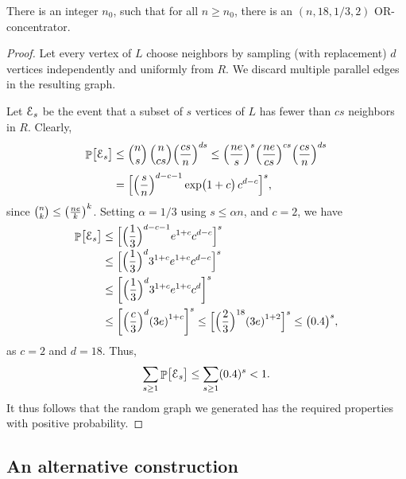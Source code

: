\begin{theorem}
    There is an integer $n_0$, such that for all $n \geq n_0$, there
    is an $(n,18, 1/3, 2)$ OR-concentrator.
\end{theorem}
\begin{proof}
    Let every vertex of $L$ choose neighbors by sampling (with
    replacement) $d$ vertices independently and uniformly from $R$.
    We discard multiple parallel edges in the resulting graph.
    
    Let $\EuScript{E}_s$ be the event that a subset of $s$ vertices of $L$
    has fewer than $cs$ neighbors in $R$. Clearly,
    \begin{align*}
        \Prob{\bigl.\Event_s}%
        &\leq%
        \mybinom{n}{s} \, \mybinom{n}{cs} \pth{ \frac{cs}{n}}^{ds}%
        \leq%
        \pth{\frac{ne}{s}}^s \pth{\frac{ne}{cs}}^{cs} \pth{
           \frac{cs}{n}}^{ds}%
        \\&=%
        \Bigl[ \pth{\frac{s}{n}}^{d-c-1} \exp\pth{\bigl. 1+c}\,
        c^{d-c} \Bigr]^s,
    \end{align*}
    since $\binom{n}{k} \leq \pth{\frac{ne}{k}}^k$. Setting
    $\alpha = 1/3$ using $s\leq \alpha n$, and $c=2$, we have
    \begin{align*}
      \Prob{\bigl. \Event_s}%
      &\leq%
        \brk{ \Bigl. \smash{ \pth{\Bigl.\smash{\frac{1}{3}}}^{d-c-1} e^{1+c} c^{d-c} }}^s%
        \\&\leq %
        \brk{ \Bigl. \smash{\Bigl(\frac{1}{3} \Bigr)^{d}}3^{1+c} e^{1+c} c^{d-c}}^s%
        \\&\leq %
        \brk{ \Bigl( \frac{1}{3} \Bigr)^{d}3^{1+c}
        e^{1+c} c^{d}}^s  \\
      &\leq%
        \brk{ \pth{\frac{c}{3}}^{d}\pth{3e}^{1+c} }^s%
        \leq%
        \Bigl[ \Bigl(\frac{2}{3} \Bigr)^{18}\pth{3e}^{1+2} \Bigr]^s%
        \leq%
        \pth{\bigl.0.4}^s,
    \end{align*}
    as $c=2$ and $d=18$. Thus,
    \begin{align*}
      \sum_{s \geq 1} \Prob{ \bigl. \Event_s}%
      \leq%
      \sum_{s\geq 1} (0.4)^s%
      <%
      1.
    \end{align*}
    It thus follows that the random graph we generated has the
    required properties with positive probability.
\end{proof}


\subsection{An alternative construction}


